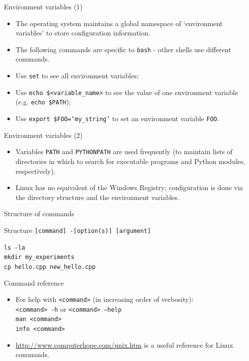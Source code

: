 \documentclass[dvipsnames]{beamer}
\newcommand{\command}[1]{\colorbox{light-gray}{\texttt{#1}}}
\begin{document}
\begin{frame}{Environment variables (1)}
  \begin{itemize}
    \item The operating system maintains a global namespace of `environment variables' to store configuration information.
    \item The following commands are specific to \command{bash} - other shells use different commands.
    \item Use  \command{set} to see all environment variables;
    \item Use \command{echo \$<variable\_name>} to see the value of one environment variable (e.g. \command{echo \$PATH});
    \item Use \command{export \$FOO=`my\_string'} to set an environment variable \texttt{FOO}.
  \end{itemize}
\end{frame}


\begin{frame}{Environment variables (2)}
  \begin{itemize}
    \item Variables \texttt{PATH} and \texttt{PYTHONPATH} are used frequently (to maintain lists of directories in which to search for executable programs and Python modules, respectively).
    \item Linux has no equivalent of the Windows Registry; configuration is done via the directory structure and the environment variables.
  \end{itemize}
\end{frame}


\begin{frame}{Structure of commands}
  \begin{block}{Structure}
    \command{[command] -[option(s)] [argument]}
  \end{block}
  \begin{Examples}
     \command{ls -la} \\
     \command{mkdir my\_experiments} \\
     \command{cp hello.cpp new\_hello.cpp}
  \end{Examples}
\end{frame}


\begin{frame}{Command reference}
  \begin{itemize}
  \item For help with \command{<command>} (in increasing order of verbosity): \\ \command{<command> -h} or \command{<command> --help} \\ \command{man <command>} \\ \command{info <command>}
  \item \url{http://www.computerhope.com/unix.htm} is a useful reference for Linux commands.
\end{itemize}
\end{frame}
\end{document}
